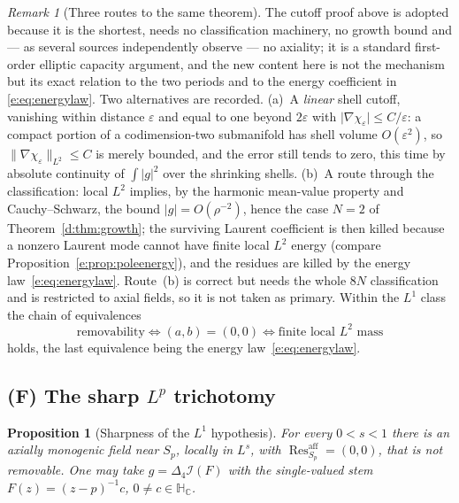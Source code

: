 \documentclass[11pt,a4paper]{article}
\numberwithin{equation}{section}
\newtheorem{proposition}[theorem]{Proposition}
\theoremstyle{definition}
\theoremstyle{remark}
\newtheorem{remark}[theorem]{Remark}
\theoremstyle{plain}
\newcommand{\HC}{\mathbb H_{\mathbb C}}
\newcommand{\lap}{\Delta_4}
\newcommand{\I}{\mathcal I}
\newcommand{\Sp}{S_{p}}
\newcommand{\abs}[1]{\lvert #1\rvert}
\newcommand{\norm}[1]{\lVert #1\rVert}
\newcommand{\Resaff}{\operatorname{Res}^{\mathrm{aff}}}
\begin{document}
\begin{remark}[Three routes to the same theorem]
\label{d:rem:L2-routes}
The cutoff proof above is adopted because it is the shortest, needs no
classification machinery, no growth bound and --- as several sources
independently observe --- no axiality; it is a standard first-order
elliptic capacity argument, and the new content here is not the mechanism
but its exact relation to the two periods and to the energy coefficient in
\eqref{e:eq:energylaw}.  Two alternatives are recorded.  (a)~A \emph{linear} shell
cutoff, vanishing within distance $\varepsilon$ and equal to one beyond
$2\varepsilon$ with $\abs{\nabla\chi_\varepsilon}\le C/\varepsilon$: a
compact portion of a codimension-two submanifold has shell volume
$O(\varepsilon^2)$, so $\norm{\nabla\chi_\varepsilon}_{L^2}\le C$ is merely
bounded, and the error still tends to zero, this time by absolute
continuity of $\int\abs g^2$ over the shrinking shells.  (b)~A route
through the classification: local $L^2$ implies, by the harmonic mean-value
property and Cauchy--Schwarz, the bound $\abs g=O(\rho^{-2})$, hence the
case $N=2$ of Theorem~\ref{d:thm:growth}; the surviving Laurent
coefficient is then killed because a nonzero Laurent mode cannot have
finite local $L^2$ energy (compare Proposition~\ref{e:prop:poleenergy}),
and the residues are killed by the energy law~\eqref{e:eq:energylaw}.  Route~(b) is correct but needs the whole $8N$ classification
and is restricted to axial fields, so it is not taken as primary.  Within
the $L^1$ class the chain of equivalences
\[
 \text{removability}
 \iff (a,b)=(0,0)
 \iff \text{finite local }L^2\text{ mass}
\]
holds, the last equivalence being the energy law~\eqref{e:eq:energylaw}.
\end{remark}

\subsection{(F) The sharp $L^p$ trichotomy}

\begin{proposition}[Sharpness of the $L^1$ hypothesis]
\label{d:prop:L1sharp}
For every $0<s<1$ there is an axially monogenic field near $\Sp$, locally
in $L^s$, with $\Resaff_{\Sp}=(0,0)$, that is not removable.  One may take
$g=\lap\I(F)$ with the single-valued stem $F(z)=(z-p)^{-1}c$,
$0\ne c\in\HC$.
\end{proposition}
\end{document}
